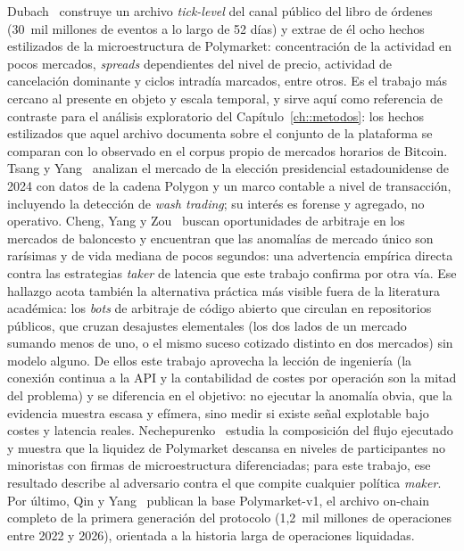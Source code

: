 Dubach~\cite{dubach2026anatomy} construye un archivo \emph{tick-level} del canal
público del libro de órdenes (30~mil millones de eventos a lo largo de 52 días) y
extrae de él ocho hechos estilizados de la microestructura de Polymarket:
concentración de la actividad en pocos mercados, \emph{spreads} dependientes del
nivel de precio, actividad de cancelación dominante y ciclos intradía marcados,
entre otros. Es el trabajo más cercano al presente en objeto y escala temporal, y
sirve aquí como referencia de contraste para el análisis exploratorio del
Capítulo~\ref{ch::metodos}: los hechos estilizados que aquel archivo documenta
sobre el conjunto de la plataforma se comparan con lo observado en el corpus propio
de mercados horarios de Bitcoin. Tsang y Yang~\cite{tsang2026election} analizan el
mercado de la elección presidencial estadounidense de 2024 con datos de la cadena
Polygon y un marco contable a nivel de transacción, incluyendo la detección de
\emph{wash trading}; su interés es forense y agregado, no operativo. Cheng, Yang y
Zou~\cite{cheng2026arbitrage} buscan oportunidades de arbitraje en los mercados de
baloncesto y encuentran que las anomalías de mercado único son rarísimas y de vida
mediana de pocos segundos: una advertencia empírica directa contra las estrategias
\emph{taker} de latencia que este trabajo confirma por otra vía. Ese hallazgo acota
también la alternativa práctica más visible fuera de la literatura académica: los
\emph{bots} de arbitraje de código abierto que circulan en repositorios públicos,
que cruzan desajustes elementales (los dos lados de un mercado sumando menos de uno,
o el mismo suceso cotizado distinto en dos mercados) sin modelo alguno. De ellos este
trabajo aprovecha la lección de ingeniería (la conexión continua a la API y la
contabilidad de costes por operación son la mitad del problema) y se diferencia en el
objetivo: no ejecutar la anomalía obvia, que la evidencia muestra escasa y efímera,
sino medir si existe señal explotable bajo costes y latencia reales.
Nechepurenko~\cite{nechepurenko2026nonretail} estudia la composición del flujo
ejecutado y muestra que la liquidez de Polymarket descansa en niveles de
participantes no minoristas con firmas de microestructura diferenciadas; para este
trabajo, ese resultado describe al adversario contra el que compite cualquier
política \emph{maker}. Por último, Qin y Yang~\cite{qin2026polymarketv1} publican la
base Polymarket-v1, el archivo on-chain completo de la primera generación del
protocolo (1,2~mil millones de operaciones entre 2022 y 2026), orientada a la
historia larga de operaciones liquidadas.

